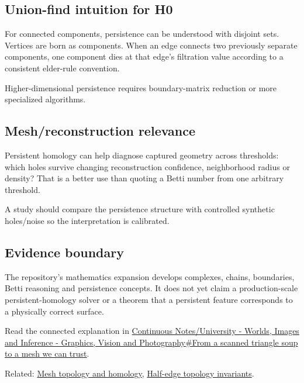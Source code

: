 \subsection{Union-find intuition for H0}\label{appendix-e4d8ed8d6787-union-find-intuition-for-h0}

For connected components, persistence can be understood with disjoint sets. Vertices are born as components. When an edge connects two previously separate components, one component dies at that edge's filtration value according to a consistent elder-rule convention.

Higher-dimensional persistence requires boundary-matrix reduction or more specialized algorithms.

\subsection{Mesh/reconstruction relevance}\label{appendix-e4d8ed8d6787-meshreconstruction-relevance}

Persistent homology can help diagnose captured geometry across thresholds: which holes survive changing reconstruction confidence, neighborhood radius or density? That is a better use than quoting a Betti number from one arbitrary threshold.

A study should compare the persistence structure with controlled synthetic holes/noise so the interpretation is calibrated.

\subsection{Evidence boundary}\label{appendix-e4d8ed8d6787-evidence-boundary}

The repository's mathematics expansion develops complexes, chains, boundaries, Betti reasoning and persistence concepts. It does not yet claim a production-scale persistent-homology solver or a theorem that a persistent feature corresponds to a physically correct surface.

Read the connected explanation in \hyperref[03-visual-computing-i-ch002-from-a-scanned-triangle-soup-to-a-mesh-we-can-trust]{Continuous Notes/University - Worlds, Images and Inference - Graphics, Vision and Photography\#From a scanned triangle soup to a mesh we can trust}.

Related: \hyperref[appendix-e38976cbbf86]{Mesh topology and homology}, \hyperref[appendix-faac749c9cdd]{Half-edge topology invariants}.
